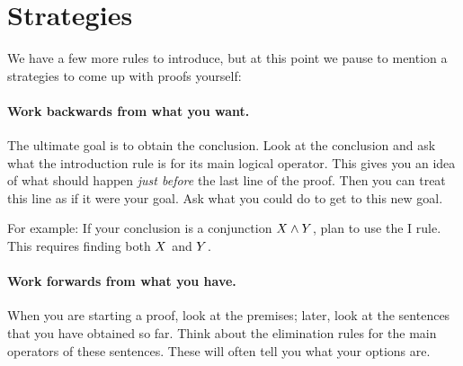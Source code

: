 %

\section{Strategies}
We have a few more rules to introduce, but at this point we pause to mention a strategies to come up with proofs yourself:

\paragraph{Work backwards from what you want.}
The ultimate goal is to obtain the conclusion. Look at the conclusion and ask what the introduction rule is for its main logical operator. This gives you an idea of what should happen \emph{just before} the last line of the proof. Then you can treat this line as if it were your goal. Ask what you could do to get to this new goal.

For example: If your conclusion is a conjunction $X\mathbin{\wedge}Y$, plan to use the {\eand}I rule. This requires finding both $X$ and $Y$.

\paragraph{Work forwards from what you have.}
When you are starting a proof, look at the premises; later, look at the sentences that you have obtained so far. Think about the elimination rules for the main operators of these sentences. These will often tell you what your options are.

